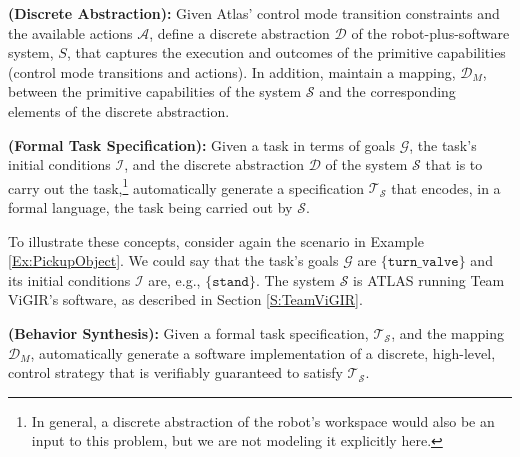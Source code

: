 
\begin{myProblem}\label{DiscreteAbstractionProblem}
\textbf{(Discrete Abstraction):}
Given Atlas' control mode transition constraints and the available actions $\mathcal{A}$, define a discrete abstraction $\mathcal{D}$ of the robot-plus-software system, $S$, that captures the execution and outcomes of the primitive capabilities (control mode transitions and actions).
In addition, maintain a mapping, $\mathcal{D}_M$, between the primitive capabilities of the system $\mathcal{S}$ and the corresponding elements of the discrete abstraction.
\end{myProblem}

\begin{myProblem}\label{SpecificationProblem}
\textbf{(Formal Task Specification):}
Given a task in terms of goals $\mathcal{G}$, the task's initial conditions $\mathcal{I}$, and the discrete abstraction $\mathcal{D}$ of the system $\mathcal{S}$ that is to carry out the task,\footnote{In general, a discrete abstraction of the robot's workspace would also be an input to this problem, but we are not modeling it explicitly here.}
 automatically generate a specification $\mathcal{T}_\mathcal{S}$ that encodes, in a formal language, the task being carried out by $\mathcal{S}$.
\end{myProblem}

To illustrate these concepts, consider again the scenario in Example \ref{Ex:PickupObject}. 
We could say that the task's goals $\mathcal{G}$ are $\{ \mathtt{turn\_valve} \}$ and its initial conditions $\mathcal{I}$ are, e.g., $\{ \mathtt{stand} \}$.
The system $\mathcal{S}$ is ATLAS running Team ViGIR's software, as described in Section \ref{S:TeamViGIR}.

\begin{myProblem}\label{BehaviorSynthesisProblem}
\textbf{(Behavior Synthesis):}
Given a formal task specification, $\mathcal{T}_\mathcal{S}$, and the mapping $\mathcal{D}_M$, automatically generate a software implementation of a discrete, high-level, control strategy that is verifiably guaranteed to satisfy $\mathcal{T}_\mathcal{S}$.
\end{myProblem}

